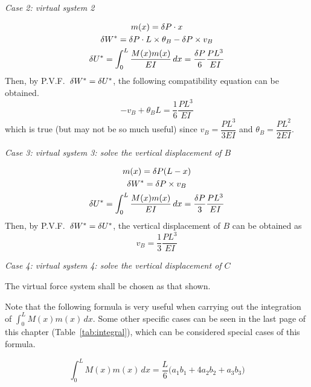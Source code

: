 \begin{example}[Application of P.V.F.]
\emph{Case 2: virtual system 2}
\begin{fig}
  
\end{fig}
\begin{gather*}
  m(x) = \delta P\cdot x\\
  \delta W^* = \delta P\cdot L\times\theta_B - \delta P\times v_B\\
  \delta U^* = \int_0^L\frac{M(x)m(x)}{EI}\,dx = \frac{\delta P}{6}\frac{PL^3}{EI}
\end{gather*}
Then, by P.V.F.\ $\delta W^* = \delta U^*$, the following compatibility equation can be obtained.
\begin{equation*}
  -v_B + \theta_BL = \frac16\frac{PL^3}{EI}
\end{equation*}
which is true (but may not be so much useful) since $v_B = \dfrac{PL^3}{3EI}$ and $\theta_B = \dfrac{PL^2}{2EI}$.

\emph{Case 3: virtual system 3: solve the vertical displacement of $B$}
\begin{fig}
  
\end{fig}
\begin{gather*}
  m(x) = \delta P(L-x)\\
  \delta W^* = \delta P\times v_B\\
  \delta U^* = \int_0^L\frac{M(x)m(x)}{EI}\,dx = \frac{\delta P}{3}\frac{PL^3}{EI}
\end{gather*}
Then, by P.V.F.\ $\delta W^* = \delta U^*$, the vertical displacement of $B$ can be obtained as
\begin{equation*}
  v_B = \frac13\frac{PL^3}{EI}
\end{equation*}

\emph{Case 4: virtual system 4: solve the vertical displacement of $C$}
\begin{fig}
  
\end{fig}
The virtual force system shall be chosen as that shown.

Note that the following formula is very useful when carrying out the integration of $\int_0^LM(x)m(x)\,dx$. Some other specific cases can be seen in the last page of this chapter (Table~\ref{tab:integral}), which can be considered special cases of this formula.
\begin{fig}
  
\end{fig}
\begin{equation}
  \int_0^LM(x)m(x)\,dx = \frac L6\bigl(a_1b_1 + 4a_2b_2 + a_3b_3\bigr)
\end{equation}
\end{example}

